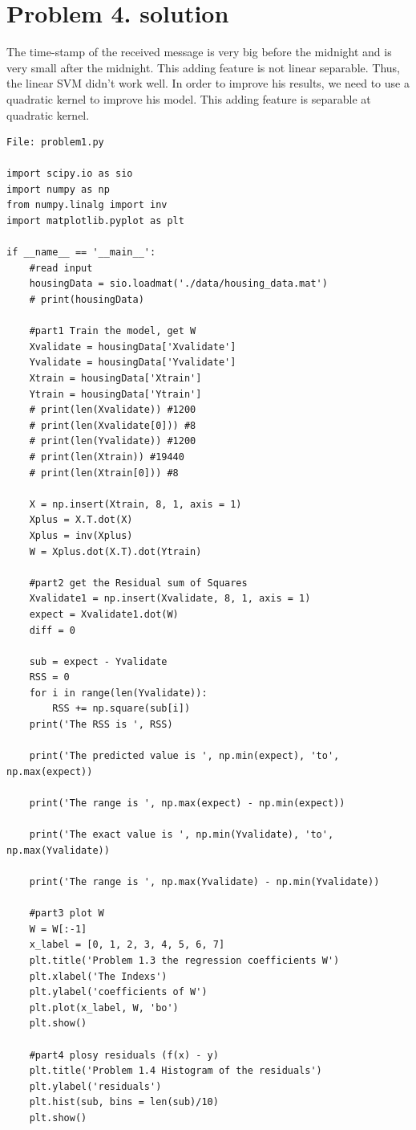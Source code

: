 \documentclass[11pt]{article}
\begin{document}
\section*{Problem 4. solution}
The time-stamp of the received message is very big before the midnight and is very small after the midnight. This adding feature is not linear separable. Thus, the linear SVM didn't work well. In order to improve his results, we need to use a quadratic kernel to improve his model. This adding feature is separable at quadratic kernel.  
\newpage
\begin{lstlisting}
File: problem1.py

import scipy.io as sio
import numpy as np
from numpy.linalg import inv
import matplotlib.pyplot as plt

if __name__ == '__main__':
	#read input
	housingData = sio.loadmat('./data/housing_data.mat')
	# print(housingData)

	#part1 Train the model, get W
	Xvalidate = housingData['Xvalidate']
	Yvalidate = housingData['Yvalidate']
	Xtrain = housingData['Xtrain']
	Ytrain = housingData['Ytrain']
	# print(len(Xvalidate)) #1200
	# print(len(Xvalidate[0])) #8
	# print(len(Yvalidate)) #1200
	# print(len(Xtrain)) #19440
	# print(len(Xtrain[0])) #8

	X = np.insert(Xtrain, 8, 1, axis = 1)
	Xplus = X.T.dot(X)
	Xplus = inv(Xplus)
	W = Xplus.dot(X.T).dot(Ytrain)

	#part2 get the Residual sum of Squares
	Xvalidate1 = np.insert(Xvalidate, 8, 1, axis = 1)
	expect = Xvalidate1.dot(W)
	diff = 0

	sub = expect - Yvalidate
	RSS = 0
	for i in range(len(Yvalidate)):
		RSS += np.square(sub[i])
	print('The RSS is ', RSS)

	print('The predicted value is ', np.min(expect), 'to', np.max(expect))

	print('The range is ', np.max(expect) - np.min(expect))

	print('The exact value is ', np.min(Yvalidate), 'to', np.max(Yvalidate))

	print('The range is ', np.max(Yvalidate) - np.min(Yvalidate))

	#part3 plot W
	W = W[:-1]
	x_label = [0, 1, 2, 3, 4, 5, 6, 7]
	plt.title('Problem 1.3 the regression coefficients W')
	plt.xlabel('The Indexs')
	plt.ylabel('coefficients of W')
	plt.plot(x_label, W, 'bo')
	plt.show()

	#part4 plosy residuals (f(x) - y)
	plt.title('Problem 1.4 Histogram of the residuals')
	plt.ylabel('residuals')
	plt.hist(sub, bins = len(sub)/10)
	plt.show()

\end{lstlisting}
\end{document}
